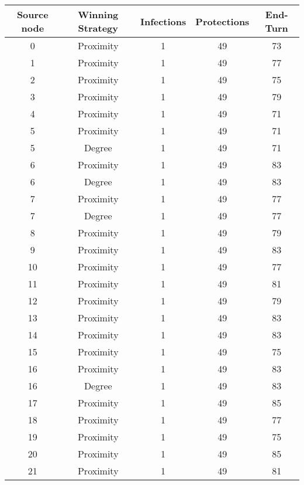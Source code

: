 \documentclass[results.tex]{subfiles}
\begin{document}
\begin{center}
  \begin{tabular}{| c || c | c | c | c |}
    \hline
    {\bfseries Source node} & {\bfseries Winning Strategy} & {\bfseries Infections} & {\bfseries Protections} & {\bfseries End-Turn} \\  %
    \hline\hline
    0 & Proximity & 1 & 49 & 73 \\ 
    \hline
    1 & Proximity & 1 & 49 & 77 \\ 
    \hline
    2 & Proximity & 1 & 49 & 75 \\ 
    \hline
    3 & Proximity & 1 & 49 & 79 \\ 
    \hline
    4 & Proximity & 1 & 49 & 71 \\ 
    \hline
    5 & Proximity & 1 & 49 & 71 \\ 
    \hline
    5 & Degree & 1 & 49 & 71 \\ 
    \hline
    6 & Proximity & 1 & 49 & 83 \\ 
    \hline
    6 & Degree & 1 & 49 & 83 \\ 
    \hline
    7 & Proximity & 1 & 49 & 77 \\ 
    \hline
    7 & Degree & 1 & 49 & 77 \\ 
    \hline
    8 & Proximity & 1 & 49 & 79 \\ 
    \hline
    9 & Proximity & 1 & 49 & 83 \\ 
    \hline
    10 & Proximity & 1 & 49 & 77 \\ 
    \hline
    11 & Proximity & 1 & 49 & 81 \\ 
    \hline
    12 & Proximity & 1 & 49 & 79 \\ 
    \hline
    13 & Proximity & 1 & 49 & 83 \\ 
    \hline
    14 & Proximity & 1 & 49 & 83 \\ 
    \hline
    15 & Proximity & 1 & 49 & 75 \\ 
    \hline
    16 & Proximity & 1 & 49 & 83 \\ 
    \hline
    16 & Degree & 1 & 49 & 83 \\ 
    \hline
    17 & Proximity & 1 & 49 & 85 \\ 
    \hline
    18 & Proximity & 1 & 49 & 77 \\ 
    \hline
    19 & Proximity & 1 & 49 & 75 \\ 
    \hline
    20 & Proximity & 1 & 49 & 85 \\ 
    \hline
    21 & Proximity & 1 & 49 & 81 \\ 

\end{tabular}
\end{center}
\end{document}
